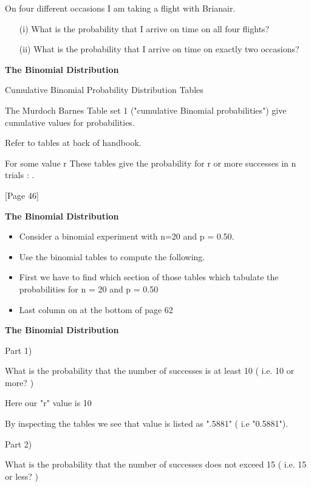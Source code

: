 \documentclass[]{report}
\begin{document}
On four different occasions I am taking a flight with Brianair.
\begin{itemize}
\item[(i)] What is the probability that I arrive on time on all four flights?
\item[(ii)] What is the probability that I arrive on time on exactly two occasions?
\end{itemize}


\textbf{The Binomial Distribution}


Cumulative Binomial Probability Distribution Tables

The Murdoch Barnes Table set 1 ("cumulative Binomial probabilities") give cumulative values for probabilities.

Refer to tables at back of handbook.

For some value  r These tables give the probability for r or more successes in n trials :  .

[Page 46]



\textbf{The Binomial Distribution}


\begin{itemize}
\item Consider a binomial experiment with n=20 and p = 0.50.
\item Use the binomial tables to compute the following.
\item First we have to find which section of those tables which tabulate the probabilities for n = 20 and p = 0.50
\item Last column on at the bottom of page 62
\end{itemize}



\textbf{The Binomial Distribution}



Part 1)

What is the probability that the number of successes is at least 10  ( i.e. 10 or more? ) 



Here our "r" value is 10

By inspecting the tables we see that value is listed as ".5881" 
( i.e "0.5881").

Part 2) 

What is the probability that the number of successes does not exceed 15  ( i.e. 15 or less? )
\end{document}
